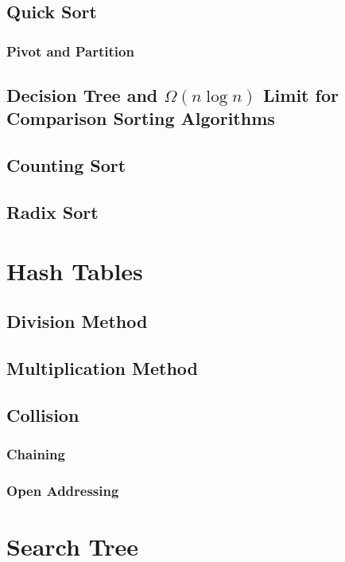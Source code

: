 \documentclass{article}
\begin{document}
\subsection{Quick Sort}

\subsubsection{Pivot and Partition}

\subsection{Decision Tree and $\Omega{(n \log{n})}$ Limit for Comparison Sorting Algorithms}

\subsection{Counting Sort}

\subsection{Radix Sort}

\section{Hash Tables}

\subsection{Division Method}

\subsection{Multiplication Method}

\subsection{Collision}

\subsubsection{Chaining}

\subsubsection{Open Addressing}

\section{Search Tree}
\end{document}

